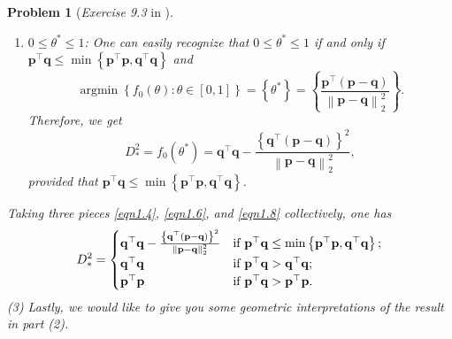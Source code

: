 \documentclass[11pt]{article}
\newtheorem{problem}{Problem}
\DeclareMathOperator*{\argmin}{argmin}
\numberwithin{equation}{problem}
\begin{document}
\begin{problem} [\emph{Exercise 9.3} in \cite{calafiore2014optimization}]
{\begin{enumerate} [label=(\roman*)]
    \begin{equation}
        \label{eqn1.5}
        \argmin \left\{ f_0 (\theta) : \theta \in [0, 1] \right\} = \left\{ 0 \right\}.
    \end{equation}
    Therefore, we get
    \begin{equation}
        \label{eqn1.6}
        D_{*}^2 = f_0 (0) = \mathbf{p}^{\top} \mathbf{p},
    \end{equation}
    provided that $\mathbf{p}^{\top} \mathbf{q} > \mathbf{p}^{\top} \mathbf{p}$;
    \item $0 \leq \theta^* \leq 1$: One can easily recognize that $0 \leq \theta^* \leq 1$ if and only if $\mathbf{p}^{\top} \mathbf{q} \leq \min \left\{ \mathbf{p}^{\top} \mathbf{p}, \mathbf{q}^{\top} \mathbf{q} \right\}$ and
    \begin{equation}
        \label{eqn1.7}
        \argmin \left\{ f_0 (\theta) : \theta \in [0, 1] \right\} = \left\{ \theta^* \right\} = \left\{ \frac{\mathbf{p}^{\top} \left( \mathbf{p} - \mathbf{q} \right)}{\left\| \mathbf{p} - \mathbf{q} \right\|_{2}^2} \right\}.
    \end{equation}
    Therefore, we get
    \begin{equation}
        \label{eqn1.8}
        D_{*}^2 = f_0 \left( \theta^* \right) = \mathbf{q}^{\top} \mathbf{q} - \frac{\left\{ \mathbf{q}^{\top} \left( \mathbf{p} - \mathbf{q} \right) \right\}^2}{\left\| \mathbf{p} - \mathbf{q} \right\|_{2}^2},
    \end{equation}
    provided that $\mathbf{p}^{\top} \mathbf{q} \leq \min \left\{ \mathbf{p}^{\top} \mathbf{p}, \mathbf{q}^{\top} \mathbf{q} \right\}$.
\end{enumerate}
\indent Taking three pieces \eqref{eqn1.4}, \eqref{eqn1.6}, and \eqref{eqn1.8} collectively, one has
\begin{equation}
    \label{eqn1.9}
    D_{*}^2 =
    \begin{cases}
        \mathbf{q}^{\top} \mathbf{q} - \frac{\left\{ \mathbf{q}^{\top} \left( \mathbf{p} - \mathbf{q} \right) \right\}^2}{\left\| \mathbf{p} - \mathbf{q} \right\|_{2}^2} & \textnormal{if } \mathbf{p}^{\top} \mathbf{q} \leq \min \left\{ \mathbf{p}^{\top} \mathbf{p}, \mathbf{q}^{\top} \mathbf{q} \right\}; \\
        \mathbf{q}^{\top} \mathbf{q} & \textnormal{if } \mathbf{p}^{\top} \mathbf{q} > \mathbf{q}^{\top} \mathbf{q}; \\
        \mathbf{p}^{\top} \mathbf{p} & \textnormal{if } \mathbf{p}^{\top} \mathbf{q} > \mathbf{p}^{\top} \mathbf{p}.
    \end{cases}
\end{equation}
\indent (3) Lastly, we would like to give you some geometric interpretations of the result in part (2).
\medskip

}
\end{problem}
\end{document}
